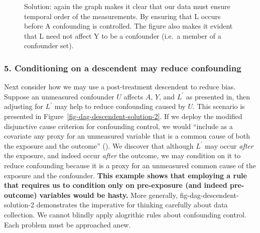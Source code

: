 \documentclass[
  singlecolumn]{article}
\begin{document}
\begin{figure}


\caption{\label{fig-dag-descendent-solution}Solution: again the graph
makes it clear that our data must ensure temporal order of the
measurements. By ensuring that L occurs before A confounding is
controlled. The figure also makes it evident that L need not affect Y to
be a confounder (i.e.~a member of a confounder set).}

\end{figure}%

\subsubsection{5. Conditioning on a descendent may reduce
confounding}\label{conditioning-on-a-descendent-may-reduce-confounding}

Next consider how we may use a post-treatment descendent to reduce bias.
Suppose an unmeasured confounder \(U\) affects \(A\), \(Y\), and
\(L^\prime\) as presented in, then adjusting for \(L^\prime\) may help
to reduce confounding caused by \(U\). This scenario is presented in
Figure~\ref{fig-dag-descendent-solution-2}. If we deploy the modified
disjunctive cause criterion for confounding control, we would ``include
as a covariate any proxy for an unmeasured variable that is a common
cause of both the exposure and the outcome''
(). We discover that
although \(L^\prime\) may occur \emph{after} the exposure, and indeed
occur \emph{after} the outcome, we may condition on it to reduce
confounding because it is a proxy for an unmeasured common cause of the
exposure and the confounder. \textbf{This example shows that employing a
rule that requires us to condition only on pre-exposure (and indeed
pre-outcome) variables would be hasty.} More generally,
fig-dag-descendent-solution-2 demonstrates the imperative for thinking
carefully about data collection. We cannot blindly apply alogrithic
rules about confounding control. Each problem must be approached anew.
\end{document}
